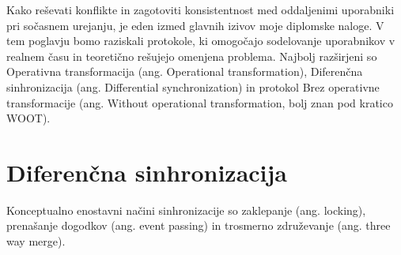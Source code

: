 \documentclass[a4paper, 12pt, twoside]{book}
\begin{document}
Kako reševati konflikte in zagotoviti konsistentnost med oddaljenimi uporabniki pri sočasnem urejanju, je eden izmed glavnih izivov moje diplomske naloge. V tem poglavju bomo raziskali protokole, ki omogočajo sodelovanje uporabnikov v realnem času in teoretično rešujejo omenjena problema. Najbolj razširjeni so Operativna transformacija (ang. Operational transformation), Diferenčna sinhronizacija (ang. Differential synchronization) in protokol Brez operativne transformacije (ang. Without operational transformation, bolj znan pod kratico WOOT).

\section{Diferenčna sinhronizacija}

Konceptualno enostavni načini sinhronizacije so zaklepanje (ang. locking), prenašanje dogodkov (ang. event passing) in trosmerno združevanje (ang. three way merge).
\end{document}
